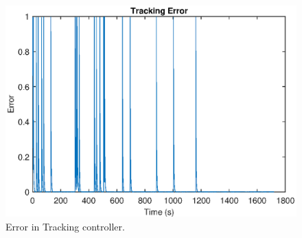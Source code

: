 \documentclass[oneside, 11pt]{book}
\begin{document}
\begin{figure}[!htbp]
    \centering
    \includegraphics{images/campus_tracking_error.eps}
    \caption{Error in Tracking controller.}
    \label{fig:mock_campus_tracking_error}
\end{figure}

\backmatter
\cleardoublepage
{}
{}
\printbibliography[title=References]

\cleardoublepage
{}
{}
\printindex
\end{document}
